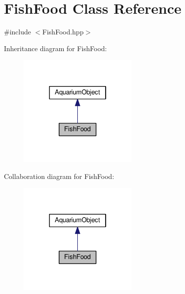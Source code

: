 \hypertarget{class_fish_food}{}\section{Fish\+Food Class Reference}
\label{class_fish_food}


{\ttfamily \#include $<$Fish\+Food.\+hpp$>$}



Inheritance diagram for Fish\+Food\+:
\nopagebreak
\begin{figure}[H]
\begin{center}
\leavevmode
\includegraphics[width=166pt]{class_fish_food__inherit__graph}
\end{center}
\end{figure}


Collaboration diagram for Fish\+Food\+:
\nopagebreak
\begin{figure}[H]
\begin{center}
\leavevmode
\includegraphics[width=166pt]{class_fish_food__coll__graph}
\end{center}
\end{figure}
